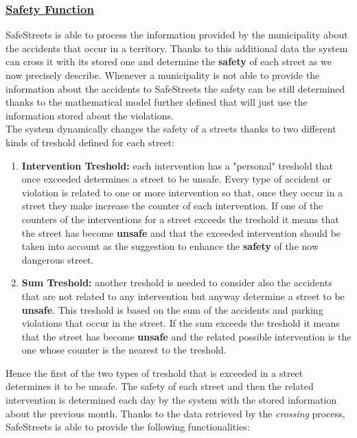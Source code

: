 	\subsubsection[Safety Function]{\hyperlink{toc}{Safety Function}}
		\label{sec:safetyFunction}
		SafeStreets is able to process the information provided by the municipality about the accidents that occur in a territory. Thanks to this additional data the system can cross it with its stored one and determine the \textbf{safety} of each street as we now precisely describe. Whenever a municipality is not able to provide the information about the accidents to SafeStreets the safety can be still determined thanks to the mathematical model further defined that will just use the information stored about the violations. \\
		
		The system dynamically changes the safety of a streets thanks to two different kinds of treshold defined for each street:
		
		\begin{enumerate}
			\item \textbf{Intervention Treshold:} each intervention has a "personal" treshold that once exceeded determines a street to be unsafe. Every type of accident or violation is related to one or more intervention so that, once they occur in a street they make increase the counter of each intervention. If one of the counters of the interventions for a street exceeds the treshold it means that the street has become \textbf{unsafe} and that the exceeded intervention should be taken into account as the suggestion to enhance the \textbf{safety} of the now dangerous street.
			
			\item \textbf{Sum Treshold:} another treshold is needed to consider also the accidents that are not related to any intervention but anyway determine a street to be \textbf{unsafe}. This treshold is based on the sum of the accidents and parking violations that occur in the street. If the sum exceeds the treshold it means that the street has become \textbf{unsafe} and the related possible intervention is the one whose counter is the nearest to the treshold.
		\end{enumerate}
	
		Hence the first of the two types of treshold that is exceeded in a street determines it to be unsafe.
		The safety of each street and then the related intervention is determined each day by the system with the stored information about the previous month. Thanks to the data retrieved by the \emph{crossing} process, SafeStreets is able to provide the following functionalities:
		
